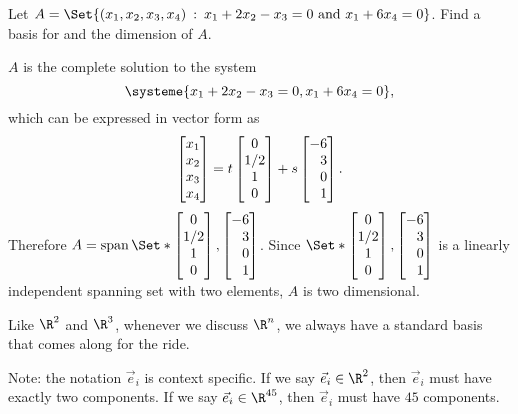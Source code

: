 \begin{example}
	Let $A=\Set{(x_1,x_2,x_3,x_4)\given x_1+2x_2-x_3=0\text{ and }x_1+6x_4=0}$. Find a basis for and the dimension
	of $A$.

	$A$ is the complete solution to the system
	\[
		\systeme{x_1+2x_2-x_3=0,x_1+6x_4=0},
	\]
	which can be expressed in vector form as
	\[
		\mat{x_1\\x_2\\x_3\\x_4} = t\matc{0\\1/2\\1\\0}+s\mat{-6\\3\\0\\1}.
	\]
	Therefore $A=\Span\Set*{\matc{0\\1/2\\1\\0}, \mat{-6\\3\\0\\1}}$. Since $\Set*{\matc{0\\1/2\\1\\0}, \mat{-6\\3\\0\\1}}$
	is a linearly independent spanning set with two elements, $A$ is two dimensional.
\end{example}

Like $\R^2$ and $\R^3$, whenever we discuss $\R^n$, we always have a standard basis that comes
along for the ride.


Note: the notation $\vec e_i$ is context specific. If we say $\vec e_i\in\R^2$,
then $\vec e_i$ must have exactly two components. If we say $\vec e_i\in\R^{45}$,
then $\vec e_i$ must have $45$ components. 
